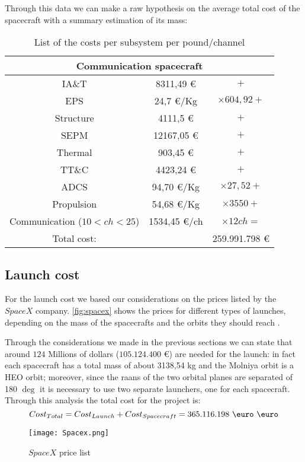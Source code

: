 	Through this data we can make a raw hypothesis on the average total cost of the spacecraft with a summary estimation of its mass:

	\begin{table}
		\centering
		\begin{tabular}{ccc}
		\toprule
		\multicolumn{3}{c}{Communication spacecraft}\\
		\midrule
		IA\&T       & 8311,49 \euro       & $+$\\
		EPS          & 24,7 \euro/Kg        & $\times 604,92 +$\\
		Structure   & 4111,5 \euro     & $+$\\
		SEPM        & 12167,05 \euro     & $+$\\
		Thermal    & 903,45 \euro        & $+$\\
		TT\&C       & 4423,24 \euro      & $+$\\
		ADCS        & 94,70 \euro/Kg     & $\times 27,52 +$\\
		Propulsion & 54,68   \euro/Kg   & $\times 3550 +$\\
		Communication ($10 < ch < 25$) & 1534,45 \euro/ch & $\times 12 ch =$\\
		\bottomrule
		Total cost:& & 259.991.798 \euro\\
		\end{tabular}
		\caption{List of the costs per subsystem per pound/channel}
		\label{tab:cost}
	\end{table}
\subsection{Launch cost}
For the launch cost we based our considerations on the prices listed by the $SpaceX$ company. \autoref{fig:spacex} shows the prices for different types of launches, depending on the mass of the spacecrafts and the orbits they should reach \cite{spacex}.

Through the considerations we made in the previous sections we can state that around $124$ Millions of dollars ($105.124.400$ \euro) are needed for the launch: in fact each spacecraft has a total mass of about 3138,54 kg and the Molniya orbit is a HEO orbit; moreover, since the raans of the two orbital planes are separated of 180 $\deg$ it is necessary to use two separate launchers, one for each spacecraft.\\

Through this analysis the total cost for the project is:
\begin{equation}
Cost_{Total} = Cost_{Launch} + Cost_{Spacecraft} =  365.116.198 \text{ $\euro$}
\text{ \euro}
\end{equation}

\begin{figure}[htbp]
\centering
\texttt{[image: Spacex.png]}
\caption{$SpaceX$ price list}
\label{fig:spacex}
\end{figure}
